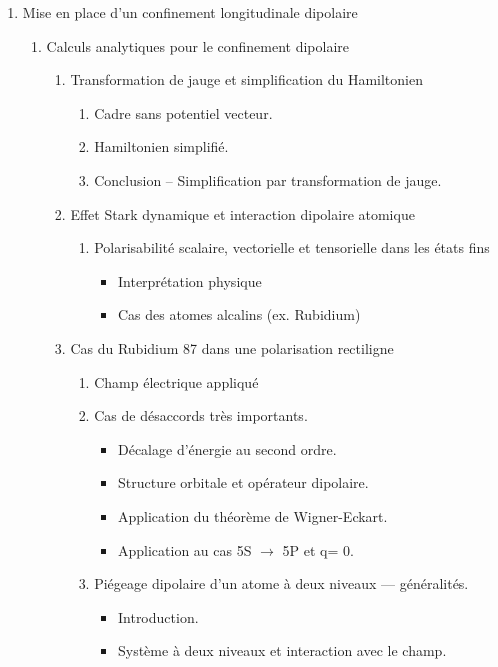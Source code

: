 \documentclass[8pt, landscape]{report}
\begin{document}
\begin{multicols}{3}
\begin{enumerate}
	\item Mise en place d’un confinement longitudinale dipolaire 
		\begin{enumerate}
			\item Calculs analytiques pour le confinement dipolaire
				\begin{enumerate}
					\item Transformation de jauge et simplification du Hamiltonien 
						\begin{enumerate}
							\item Cadre sans potentiel vecteur. 
							\item Hamiltonien simplifié.
							\item Conclusion – Simplification par transformation de jauge.
						\end{enumerate}
					\item Effet Stark dynamique et interaction dipolaire atomique 
						\begin{enumerate}
							\item Polarisabilité scalaire, vectorielle et tensorielle dans les états fins
								\begin{itemize}
									\item Interprétation physique
									\item Cas des atomes alcalins (ex. Rubidium)
								\end{itemize}
						\end{enumerate}
					\item Cas du Rubidium 87 dans une polarisation rectiligne 
						\begin{enumerate}
							\item Champ électrique appliqué 
							\item Cas de désaccords très importants. 
								\begin{itemize}
									\item Décalage d’énergie au second ordre. 
									\item Structure orbitale et opérateur dipolaire.
									\item Application du théorème de Wigner-Eckart. 
									\item Application au cas 5S $\to $ 5P et q= 0. 	
								\end{itemize} 
							\item Piégeage dipolaire d’un atome à deux niveaux — généralités.
								\begin{itemize}
									\item Introduction. 
									\item Système à deux niveaux et interaction avec le champ. 

\end{itemize}
\end{enumerate}
\end{enumerate}
\end{enumerate}
\end{enumerate}
\end{multicols}
\end{document}
